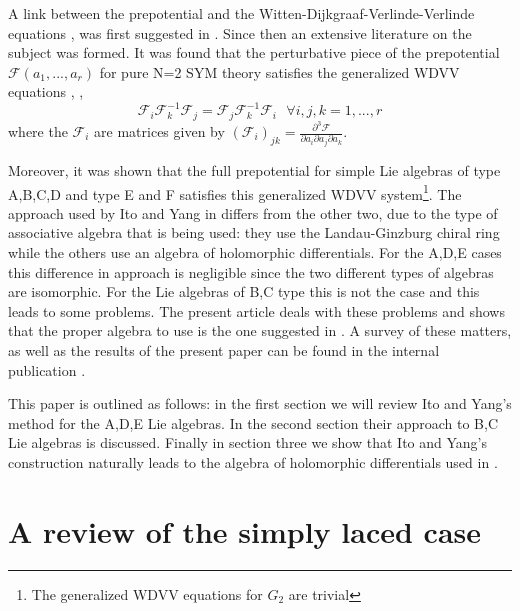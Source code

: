 \documentclass[a4paper,11pt]{article}
\numberwithin{equation}{section}
\begin{document}
\bigskip
\noindent 
A link between the prepotential and the Witten-Dijkgraaf-Verlinde-Verlinde
equations \cite{WITT:1991},\cite{DIJK-VERL-VERL:1991} was first suggested in
\cite{BONE-MATO:1996}. Since then an extensive literature on the subject was
formed. It was found that the perturbative piece of the prepotential
$\mathcal{F}(a_{1},...,a_{r})$ for pure N=2 SYM theory satisfies the
generalized WDVV equations \cite{MARS-MIRO-MORO:1996},\cite{MART-GRAG:1999}%
,\cite{VESE:1999}
\begin{equation}
\mathcal{F}_{i}\mathcal{F}_{k}^{-1}\mathcal{F}_{j}=\mathcal{F}_{j}%
\mathcal{F}_{k}^{-1}\mathcal{F}_{i}\text{ \ \ \ \ }\forall i,j,k=1,...,r
\end{equation}
where the $\mathcal{F}_{i}$ are matrices given by $\left(  \mathcal{F}%
_{i}\right)  _{jk}=\frac{\partial^{3}\mathcal{F}}{\partial a_{i}\partial
a_{j}\partial a_{k}}$.

\noindent
Moreover, it was shown that the full prepotential for simple Lie algebras of
type A,B,C,D \cite{MARS-MIRO-MORO:2000} and type E
\cite{ITO-YANG:1998} and F \cite{HOEV-KERS-MART:2000} satisfies this
generalized WDVV system\footnote{The generalized WDVV equations for
  $G_2$ are trivial}. The approach used by Ito and Yang in \cite{ITO-YANG:1998}
differs from the other two, due to the type of associative algebra
that is being used: they use the Landau-Ginzburg chiral ring while the 
others use an algebra of holomorphic differentials. For the A,D,E
cases this difference in approach is negligible since the two
different types of algebras are isomorphic. For the Lie
algebras of B,C type this is not the case and this leads to some
problems. The present article deals with these problems and shows that 
the proper algebra to use is the one suggested in \cite{MARS-MIRO-MORO:2000}. 
A survey of these matters, as well as the results of the
present paper can be found in the internal publication \cite{HOEV-MART:2000}.

\bigskip
\noindent
This paper is outlined as follows: in the first section we will review 
Ito and Yang's method for the A,D,E Lie algebras. In the second
section their approach to B,C Lie algebras is discussed. Finally in
section three we show that Ito and Yang's construction naturally
leads to the algebra of holomorphic differentials used in
\cite{MARS-MIRO-MORO:2000}.



\section{A review of the simply laced case}
\end{document}
